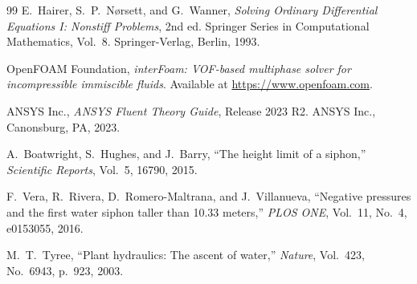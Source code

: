 \documentclass[11pt]{article}
\theoremstyle{definition}
\begin{document}
\begin{thebibliography}{99}
E.~Hairer, S.~P.~N{\o}rsett, and G.~Wanner,
\emph{Solving Ordinary Differential Equations I: Nonstiff Problems}, 2nd ed.
Springer Series in Computational Mathematics, Vol.~8. Springer-Verlag, Berlin, 1993.

OpenFOAM Foundation,
\emph{interFoam: VOF-based multiphase solver for incompressible immiscible fluids}.
Available at \url{https://www.openfoam.com}.

ANSYS Inc.,
\emph{ANSYS Fluent Theory Guide}, Release 2023 R2.
ANSYS Inc., Canonsburg, PA, 2023.

A.~Boatwright, S.~Hughes, and J.~Barry,
``The height limit of a siphon,''
\emph{Scientific Reports}, Vol.~5, 16790, 2015.

F.~Vera, R.~Rivera, D.~Romero-Maltrana, and J.~Villanueva,
``Negative pressures and the first water siphon taller than 10.33 meters,''
\emph{PLOS ONE}, Vol.~11, No.~4, e0153055, 2016.

M.~T.~Tyree,
``Plant hydraulics: The ascent of water,''
\emph{Nature}, Vol.~423, No.~6943, p.~923, 2003.

\end{thebibliography}
\end{document}
